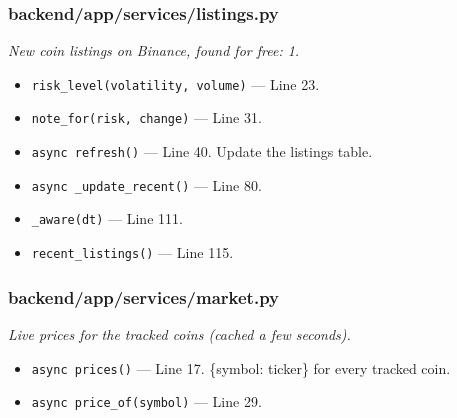 \subsubsection*{backend/app/services/listings.py}
\textit{New coin listings on Binance, found for free: 1.}
\begin{itemize}[nosep,leftmargin=1.5em]
\item \texttt{risk\_\allowbreak{}level(\allowbreak{}volatility,\allowbreak{} volume)} --- Line 23.
\item \texttt{note\_\allowbreak{}for(\allowbreak{}risk,\allowbreak{} change)} --- Line 31.
\item \texttt{async refresh(\allowbreak{})} --- Line 40. Update the listings table.
\item \texttt{async \_\allowbreak{}update\_\allowbreak{}recent(\allowbreak{})} --- Line 80.
\item \texttt{\_\allowbreak{}aware(\allowbreak{}dt)} --- Line 111.
\item \texttt{recent\_\allowbreak{}listings(\allowbreak{})} --- Line 115.
\end{itemize}
\subsubsection*{backend/app/services/market.py}
\textit{Live prices for the tracked coins (cached a few seconds).}
\begin{itemize}[nosep,leftmargin=1.5em]
\item \texttt{async prices(\allowbreak{})} --- Line 17. \{symbol: ticker\} for every tracked coin.
\item \texttt{async price\_\allowbreak{}of(\allowbreak{}symbol)} --- Line 29.
\end{itemize}
